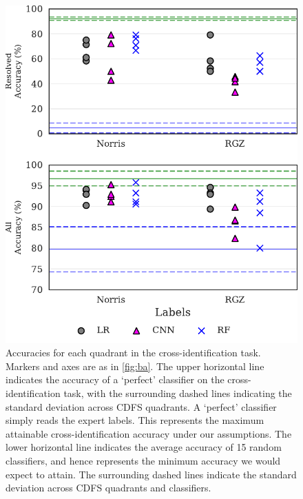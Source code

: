 \documentclass[fleqn,usenatbib,usedcolumn]{mnras}
\begin{document}
    \begin{figure}
      \centering
      \includegraphics[width=\columnwidth]{images/cdfs_cross_identification_grid.pdf}
      \caption{Accuracies for each quadrant in the cross-identification
        task. Markers and axes are as in \autoref{fig:ba}. The upper horizontal line
        indicates the accuracy of a `perfect' classifier on the cross-identification
        task, with the surrounding dashed lines indicating the standard deviation
        across CDFS quadrants. A `perfect' classifier simply reads the expert
        labels. This represents the maximum attainable cross-identification accuracy
        under our assumptions. The lower horizontal line indicates the average
        accuracy of 15 random classifiers, and hence represents the minimum accuracy
        we would expect to attain. The surrounding dashed lines indicate the
        standard deviation across CDFS quadrants and classifiers.
        \label{fig:cross-id-accuracy}}
    \end{figure}
\end{document}
